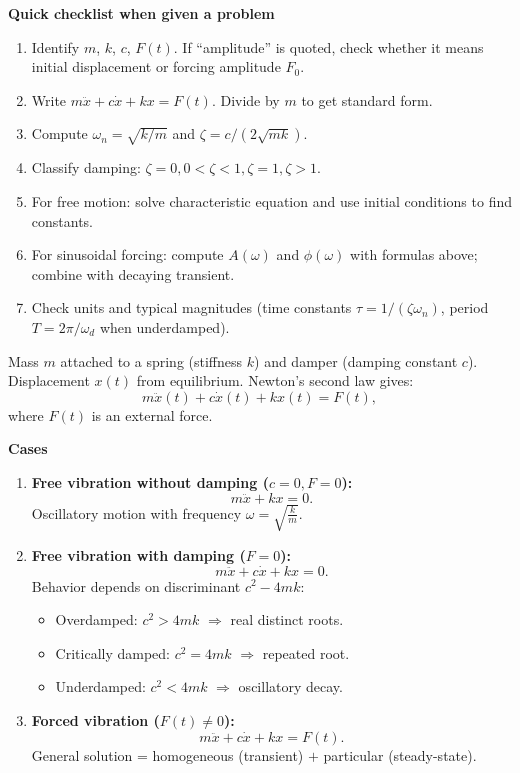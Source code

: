     \textbf{Quick checklist when given a problem}
    \begin{enumerate}
      \item Identify \(m\), \(k\), \(c\), \(F(t)\). If ``amplitude'' is quoted, check whether it means initial displacement or forcing amplitude \(F_0\).
      \item Write \(m\ddot x+c\dot x+kx=F(t)\). Divide by \(m\) to get standard form.
      \item Compute \(\omega_n=\sqrt{k/m}\) and \(\zeta=c/(2\sqrt{mk})\).
      \item Classify damping: \(\zeta=0, 0<\zeta<1, \zeta=1, \zeta>1\).
      \item For free motion: solve characteristic equation and use initial conditions to find constants.
      \item For sinusoidal forcing: compute \(A(\omega)\) and \(\phi(\omega)\) with formulas above; combine with decaying transient.
      \item Check units and typical magnitudes (time constants \(\tau=1/(\zeta\omega_n)\), period \(T=2\pi/\omega_d\) when underdamped).
    \end{enumerate}
    

  \begin{highlight}
    Mass $m$ attached to a spring (stiffness $k$) and damper (damping constant $c$). Displacement $x(t)$ from equilibrium.  
    Newton’s second law gives:
    \[
    m \ddot{x}(t) + c \dot{x}(t) + k x(t) = F(t),
    \]
    where $F(t)$ is an external force.

    \textbf{Cases}
    \begin{enumerate}
      \item \textbf{Free vibration without damping ($c=0, F=0$):}
      \[
      m \ddot{x} + kx=0.
      \]
      Oscillatory motion with frequency $\omega = \sqrt{\tfrac{k}{m}}$.

      \item \textbf{Free vibration with damping ($F=0$):}
      \[
      m \ddot{x} + c\dot{x} + kx=0.
      \]
      Behavior depends on discriminant $c^2 - 4mk$:
      \begin{itemize}
        \item Overdamped: $c^2>4mk$ $\Rightarrow$ real distinct roots.
        \item Critically damped: $c^2=4mk$ $\Rightarrow$ repeated root.
        \item Underdamped: $c^2<4mk$ $\Rightarrow$ oscillatory decay.
      \end{itemize}

      \item \textbf{Forced vibration ($F(t)\neq 0$):}
      \[
      m \ddot{x} + c\dot{x} + kx=F(t).
      \]
      General solution = homogeneous (transient) $+$ particular (steady-state).
    \end{enumerate}
  \end{highlight}
 

